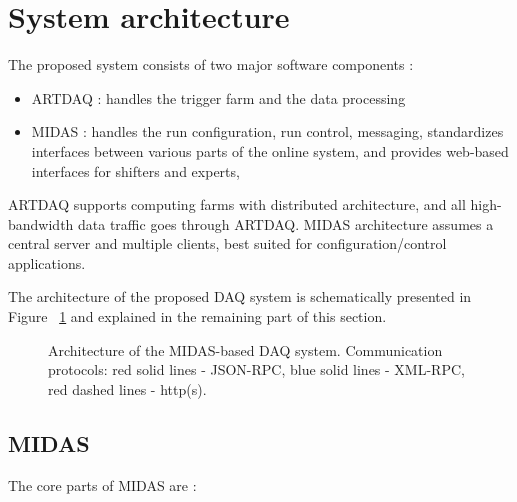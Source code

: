 \section{System architecture}

The proposed system consists of two major software components :
\begin{itemize}
\item
  ARTDAQ : handles the trigger farm and the data processing
\item
  MIDAS : handles the run configuration, run control, messaging,
  standardizes interfaces between various parts of the online system,
  and provides web-based interfaces for shifters and experts,
\end{itemize}

ARTDAQ supports computing farms with distributed architecture, 
and all high-bandwidth data traffic goes through ARTDAQ.
%
MIDAS architecture assumes a central server and multiple clients,
best suited for configuration/control applications.

The architecture of the proposed DAQ system is schematically presented
in Figure ~\ref{figure:system_architecture} and explained in the remaining
part of this section.

\begin{figure}[H]
  \caption{
    \label{figure:system_architecture}
    Architecture of the MIDAS-based DAQ system. Communication protocols:
    red solid lines - JSON-RPC, blue solid lines - XML-RPC,
    red dashed lines - http(s).
  }
\end{figure}

\subsection{MIDAS}

The core parts of MIDAS are :

